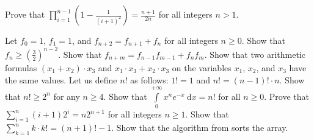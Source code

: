 \begin{chapterendexercises}
        Prove that
        $\prod_{i = 1}^{n - 1} \left(1 - \frac{1}{(i + 1)^2} \right) =
        \frac{n + 1}{2n}$ for all integers $n > 1$.

    \exercise Let $f_0 = 1$, $f_1 = 1$, and $f_{n + 2} = f_{n + 1} + f_n$ for
        all integers $n \ge 0$. Show that
        $f_n \ge \left(\frac{3}{2}\right)^{n - 2}$.
    \exercise Show that $f_{n + m} = f_{n - 1} f_{m - 1} + f_n f_m$.
    \exercise Show that two arithmetic formulas $(x_1 + x_2) \cdot x_3$ and
        $x_1 \cdot x_3 + x_2 \cdot x_3$ on the variables $x_1$, $x_2$, and $x_3$
        have the same values.
    \exercise Let us define $n!$ as follows: $1! = 1$ and
        $n! = (n - 1)! \cdot n$. Show that $n! \ge 2^n$ for any $n \ge 4$.
    \exercise Show that
        $\int\limits_0^{+\infty} x^n e^{- x} ~ \mathrm{d}x = n!$
        for all $n \ge 0$.
    \exercise Prove that $\sum_{i = 1}^n (i + 1) 2^i = n 2^{n + 1}$
        for all integers $n \ge 1$.
    \exercise Show that $\sum_{k = 1}^n k \cdot k! = (n + 1)! - 1$.
    \exercise Show that the algorithm from 
      sorts the array.
\end{chapterendexercises}
